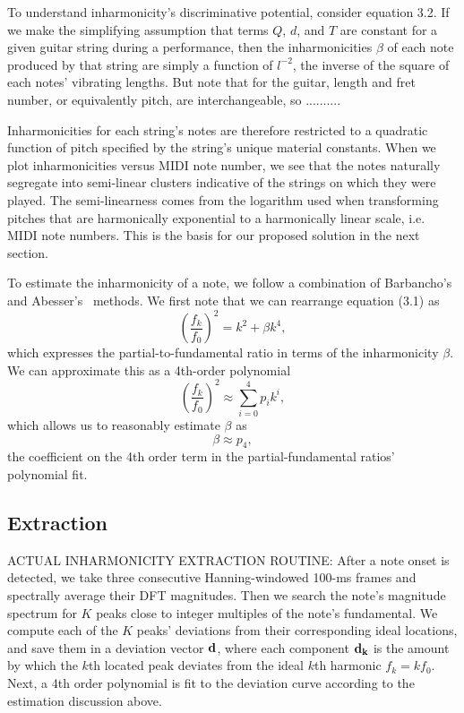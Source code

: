 \documentclass[12pt]{cmuthesis}
\begin{document}
To understand inharmonicity's discriminative potential, consider equation 3.2. If we make the simplifying assumption that terms $Q$, $d$, and $T$ are constant for a given guitar string during a performance, then the inharmonicities $\beta$ of each note produced by that string are simply a function of $l^{-2}$, the inverse of the square of each notes' vibrating lengths. But note that for the guitar, length and fret number, or equivalently pitch, are interchangeable, so .......... 

Inharmonicities for each string's notes are therefore restricted to a quadratic function of pitch specified by the string's unique material constants. When we plot inharmonicities versus MIDI note number, we see that the notes naturally segregate into semi-linear clusters indicative of the strings on which they were played. The semi-linearness comes from the logarithm used when transforming pitches that are harmonically exponential to a harmonically linear scale, i.e. MIDI note numbers. This is the basis for our proposed solution in the next section.

To estimate the inharmonicity of a note, we follow a combination of Barbancho's~\cite{barbanchoi2012} and Abesser's~\cite{abesser2012} methods. We first note that we can rearrange equation (3.1) as
\begin{equation}
(\frac{f_k}{f_0})^2 = k^2 + \beta k^4,
\end{equation}
which expresses the partial-to-fundamental ratio in terms of the inharmonicity $\beta$. We can approximate this as a 4th-order polynomial
\begin{equation}
(\frac{f_k}{f_0})^2 \approx \sum_{i=0}^{4}{p_{i}k^i},
\end{equation}
which allows us to reasonably estimate $\beta$ as
\begin{equation}
\beta \approx p_{4},
\end{equation}
the coefficient on the 4th order term in the partial-fundamental ratios' polynomial fit.

\subsection{Extraction}
 ACTUAL INHARMONICITY EXTRACTION ROUTINE: After a note onset is detected, we take three consecutive Hanning-windowed 100-ms frames and spectrally average their DFT magnitudes. Then we search the note's magnitude spectrum for $K$ peaks close to integer multiples of the note's fundamental. We compute each of the $K$ peaks' deviations from their corresponding ideal locations, and save them in a deviation vector $\bf{d}$, where each component $\bf{d_{k}}$ is the amount by which the $k$th located peak deviates from the ideal $k$th harmonic $f_k = kf_0$. Next, a 4th order polynomial is fit to the deviation curve according to the estimation discussion above.
\end{document}
